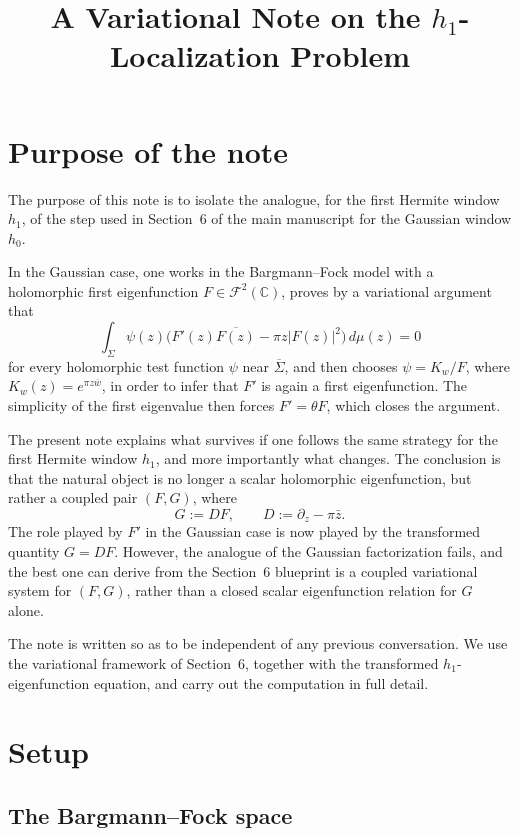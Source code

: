 \documentclass[11pt]{article}
\title{A Variational Note on the \(h_1\)-Localization Problem}
\author{}
\date{}
\newcommand{\C}{\mathbb C}
\newcommand{\F}{\mathcal F^2(\C)}
\newcommand{\dmu}{\,d\mu}
\newcommand{\pw}{\partial_z}
\newcommand{\1}{\mathbf 1}
\newcommand{\abs}[1]{\left|#1\right|}
\begin{document}
\maketitle

\section{Purpose of the note}

The purpose of this note is to isolate the analogue, for the first Hermite window
\(h_1\), of the step used in Section~6 of the main manuscript for the Gaussian
window \(h_0\).

In the Gaussian case, one works in the Bargmann--Fock model with a holomorphic
first eigenfunction \(F\in \F\), proves by a variational argument that
\[
\int_\Sigma \psi(z)\Big(F'(z)\overline{F(z)}-\pi z \abs{F(z)}^2\Big)\dmu(z)=0
\]
for every holomorphic test function \(\psi\) near \(\overline\Sigma\), and then
chooses \(\psi=K_w/F\), where \(K_w(z)=e^{\pi z\overline w}\), in order to infer that
\(F'\) is again a first eigenfunction. The simplicity of the first eigenvalue then
forces \(F'=\theta F\), which closes the argument.

The present note explains what survives if one follows the same strategy for the
first Hermite window \(h_1\), and more importantly what changes. The conclusion is
that the natural object is no longer a scalar holomorphic eigenfunction, but rather
a coupled pair \((F,G)\), where
\[
G:=DF,
\qquad
D:=\pw-\pi\bar z.
\]
The role played by \(F'\) in the Gaussian case is now played by the transformed
quantity \(G=DF\). However, the analogue of the Gaussian factorization fails, and
the best one can derive from the Section~6 blueprint is a coupled variational system
for \((F,G)\), rather than a closed scalar eigenfunction relation for \(G\) alone.

The note is written so as to be independent of any previous conversation. We use the
variational framework of Section~6, together with the transformed \(h_1\)-eigenfunction
equation, and carry out the computation in full detail.

\section{Setup}

\subsection{The Bargmann--Fock space}
\end{document}
